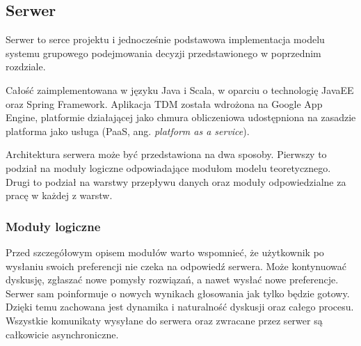 \subsection{Serwer}
Serwer to serce projektu i jednocześnie podstawowa implementacja modelu systemu
grupowego podejmowania decyzji przedstawionego w poprzednim rozdziale. 

Całość zaimplementowana w języku Java i Scala, w oparciu o technologię JavaEE
oraz Spring Framework. Aplikacja TDM została wdrożona na Google App Engine,
platformie działającej jako chmura obliczeniowa udostępniona na
zasadzie platforma jako usługa (PaaS, ang. \textit{platform as a service}).

Architektura serwera może być przedstawiona na dwa sposoby. Pierwszy to podział
na moduły logiczne odpowiadające modułom modelu teoretycznego. Drugi to podział
na warstwy przepływu danych oraz moduły odpowiedzialne za pracę w każdej z warstw.

\subsubsection{Moduły logiczne}
Przed szczegółowym opisem modułów warto wspomnieć, że użytkownik po wysłaniu
swoich preferencji nie czeka na odpowiedź serwera. Może kontynuować dyskusję,
zgłaszać nowe pomysły rozwiązań, a nawet wysłać nowe preferencje. Serwer sam
poinformuje o nowych wynikach głosowania jak tylko będzie gotowy. Dzięki temu
zachowana jest dynamika i naturalność dyskusji oraz całego procesu. Wszystkie
komunikaty wysyłane do serwera oraz zwracane przez serwer są całkowicie
asynchroniczne.

